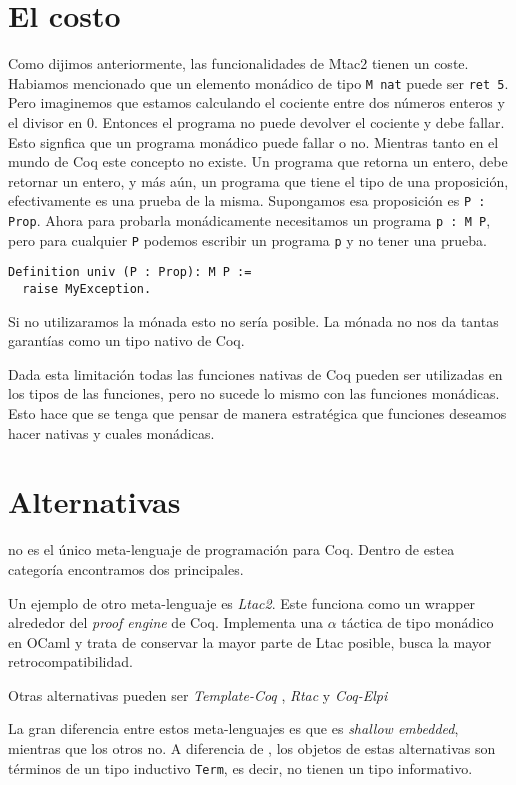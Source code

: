 \section{El costo}

Como dijimos anteriormente, las funcionalidades de Mtac2 tienen un coste. Habiamos mencionado que un elemento monádico de tipo \lstinline{M nat} puede ser \lstinline{ret 5}. Pero imaginemos que estamos calculando el cociente entre dos números enteros y el divisor en 0. Entonces el programa no puede devolver el cociente y debe fallar. Esto signfica que un programa monádico puede fallar o no. Mientras tanto en el mundo de Coq este concepto no existe. Un programa que retorna un entero, debe retornar un entero, y más aún, un programa que tiene el tipo de una proposición, efectivamente es una prueba de la misma. Supongamos esa proposición es \lstinline{P : Prop}. Ahora para probarla monádicamente necesitamos un programa \lstinline{p : M P}, pero para cualquier \lstinline{P} podemos escribir un programa \lstinline{p} y no tener una prueba.
\begin{lstlisting}
Definition univ (P : Prop): M P :=
  raise MyException.
\end{lstlisting}

Si no utilizaramos la mónada esto no sería posible. La mónada no nos da tantas garantías como un tipo nativo de Coq.

Dada esta limitación todas las funciones nativas de Coq pueden ser utilizadas en los tipos de las funciones, pero no sucede lo mismo con las funciones monádicas. Esto hace que se tenga que pensar de manera estratégica que funciones deseamos hacer nativas y cuales monádicas.

\section{Alternativas}

\Mtac no es el único meta-lenguaje de programación para Coq. 
Dentro de estea categoría encontramos dos principales.

Un ejemplo de otro meta-lenguaje es \emph{Ltac2}.
Este funciona como un wrapper alrededor del \emph{proof engine} de Coq.
Implementa una $\alpha$ táctica de tipo monádico en OCaml y trata de conservar la mayor parte de Ltac posible, busca la mayor retrocompatibilidad.

Otras alternativas pueden ser \emph{Template-Coq} \cite{DBLP:conf/itp/AnandBCST18}, \emph{Rtac} \cite{DBLP:conf/esop/MalechaB16} y \emph{Coq-Elpi} \cite{tassi:hal-01637063}

La gran diferencia entre estos meta-lenguajes es que \Mtac es \emph{shallow embedded}, mientras que los otros no. A diferencia de \Mtac, los objetos de estas alternativas son términos de un tipo inductivo \lstinline{Term}, es decir, no tienen un tipo informativo.
